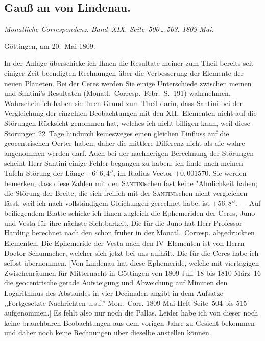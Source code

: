 \documentclass[12pt,a4paper]{book}
\begin{document}
\newpage
\subsection*{Gau{\ss} an von Lindenau.}

\textit{Monatliche Correspondenz. Band~XIX. Seite~500\,\ldots\,503. 1809 Mai.}

G\"ottingen, am 20.~Mai 1809.

In der Anlage \"uberschicke ich Ihnen die Resultate meiner zum Theil bereits seit einiger Zeit beendigten Rechnungen \"uber die Verbesserung der Elemente der neuen Planeten. Bei der Ceres werden Sie einige Unterschiede zwischen meinen und Santini's Resultaten (Monatl.~Corresp.~Febr.~S.~191) wahrnehmen. Wahrscheinlich haben sie ihren Grund zum Theil darin, dass Santini bei der Vergleichung der einzelnen Beobachtungen mit den XII.~Elementen nicht auf die St\"orungen R\"ucksicht genommen hat, welches ich nicht billigen kann, weil diese St\"orungen 22~Tage hindurch keinesweges einen gleichen Einfluss auf die geocentrischen Oerter haben, daher die mittlere Differenz nicht als die wahre angenommen werden darf. Auch bei der nachherigen Berechnung der St\"orungen scheint Herr Santini einige Fehler begangen zu haben; ich finde nach meinen Tafeln St\"orung der L\"ange $+6'\ 6{,}4''$, im Radius Vector $+0{,}001570$. Sie werden bemerken, dass diese Zahlen mit den \textsc{Santini}schen fast keine "Ahnlichkeit haben; die St\"orung der Breite, die sich freilich mit der \textsc{Santini}schen nicht vergleichen l\"asst, weil ich nach vollst\"andigem Gleichungen gerechnet habe, ist $+56{,}8''$. --- Auf beiliegendem Blatte schicke ich Ihnen zugleich die Ephemeriden der Ceres, Juno und Vesta f\"ur ihre n\"achste Sichtbarkeit. Die f\"ur die Juno hat Herr Professor Harding berechnet nach den schon fr\"uher in der Monatl.~Corresp. abgedruckten Elementen. Die Ephemeride der Vesta nach den IV~Elementen ist von Herrn Doctor Schumacher, welcher sich jetzt bei uns aufh\"alt. Die f\"ur die Ceres habe ich selbst \"ubernommen. [Von Lindenau hat diese Ephemeride, welche mit viert\"agigen Zwischenr\"aumen f\"ur Mitternacht in G\"ottingen von 1809 Juli~18 bis 1810 M\"arz~16 die geocentrische gerade Aufsteigung und Abweichung auf Minuten den Logarithmus des Abstandes in vier Decimalen angibt in dem Aufsatze ,,Fortgesetzte Nachrichten u.s.f.'' Mon.~Corr. 1809 Mai-Heft Seite~504 bis 515 aufgenommen.] Es fehlt also nur noch die Pallas. Leider habe ich von dieser noch keine brauchbaren Beobachtungen aus dem vorigen Jahre zu Gesicht bekommen und daher noch keine Rechnungen \"uber dieselbe anstellen k\"onnen.
\end{document}
